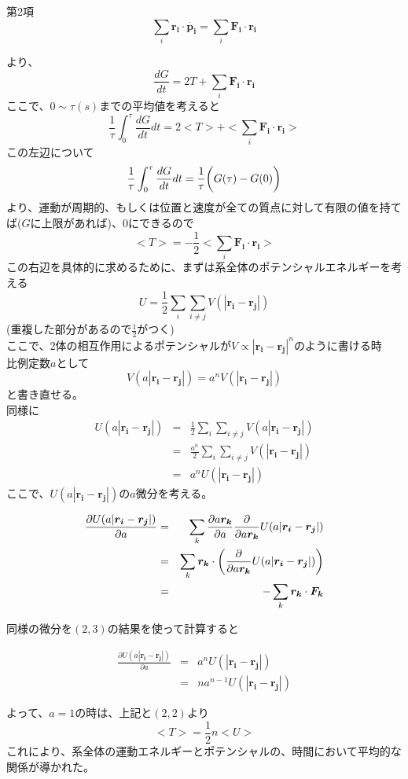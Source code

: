 \documentclass[dvipdfmx]{report} %
\begin{document}
\begin{tcolorbox}
第2項
$$
\sum_{i} \bm{r_i} \cdot \dot{ \bm{p_i} } = \sum_{i} \bm{F_i} \cdot \bm{r_i}
$$
\end{tcolorbox}
\noindent
より、
$$
\frac{dG}{dt} = 2T + \sum_{i} \bm{F_i} \cdot \bm{r_i}
$$
ここで、$0 \sim \tau (s)$までの平均値を考えると
$$
\frac{1}{\tau}\int_{0}^{\tau} \frac{dG}{dt} dt = 2<T> + <\sum_{i} \bm{F_i} \cdot \bm{r_i}>
$$
この左辺について
$$
\frac{1}{\tau} \int_{0}^{\tau} \frac{dG}{dt} dt = \frac{1}{\tau} \biggl{(} G(\tau) - G(0) \biggr{)}
$$
より、運動が周期的、もしくは位置と速度が全ての質点に対して有限の値を持てば($G$に上限があれば)、$0$にできるので
\begin{equation}
<T> = -\frac{1}{2} <\sum_{i} \bm{F_i} \cdot \bm{r_i}>
\end{equation}
この右辺を具体的に求めるために、まずは系全体のポテンシャルエネルギーを考える
$$
U = \frac{1}{2}\sum_{i} \sum_{i \neq j} V( | \bm{r_i} - \bm{r_j} | ) 
$$
(重複した部分があるので$\frac{1}{2}$がつく)\\
ここで、2体の相互作用によるポテンシャルが$V \propto | \bm{r_i} - \bm{r_j} |^n$のように書ける時\\
比例定数$a$として
$$
V(a | \bm{r_i} - \bm{r_j} | ) = a^n V( | \bm{r_i} - \bm{r_j} | ) 
$$
と書き直せる。\\
同様に
\begin{eqnarray}
	U(a | \bm{r_i} - \bm{r_j} |)  &=& \frac{1}{2}\sum_{i} \sum_{i \neq j} V(a | \bm{r_i} - \bm{r_j} | ) \nonumber \\
	&=& \frac{a^n}{2}\sum_{i} \sum_{i \neq j} V( | \bm{r_i} - \bm{r_j} | ) \nonumber \\
	&=& a^n U( | \bm{r_i} - \bm{r_j} | ) 
\end{eqnarray}
ここで、$U(a | \bm{r_i} - \bm{r_j} |)$の$a$微分を考える。
\begin{tcolorbox}
\begin{eqnarray*}
	\frac{ \partial U(a | \bm{r_i} - \bm{r_j} |)}{ \partial a} &=& \sum_{k} \frac{\partial a\bm{r_k} }{\partial a}
	\frac{ \partial }{ \partial a\bm{r_k} } U(a | \bm{r_i} - \bm{r_j} |)\\
	&=& \sum_{k} \bm{r_k} \cdot \biggl{(}  \frac{\partial}{\partial a \bm{r_k}} U(a | \bm{r_i} - \bm{r_j} |) \biggr{)}\\
	&=& - \sum_{k} \bm{r_k} \cdot \bm{F_k}
\end{eqnarray*}
\end{tcolorbox}
同様の微分を$(2,3)$の結果を使って計算すると
\begin{tcolorbox}
\begin{eqnarray*}
	\frac{ \partial U(a | \bm{r_i} - \bm{r_j} |)}{ \partial a} &=& a^n U( | \bm{r_i} - \bm{r_j} | ) \\
	&=& na^{n-1} U( | \bm{r_i} - \bm{r_j} | )
\end{eqnarray*}
\end{tcolorbox}
よって、$a=1$の時は、上記と$(2,2)$より
$$
<T> = \frac{1}{2} n <U>
$$
これにより、系全体の運動エネルギーとポテンシャルの、時間において平均的な関係が導かれた。
\end{document}
